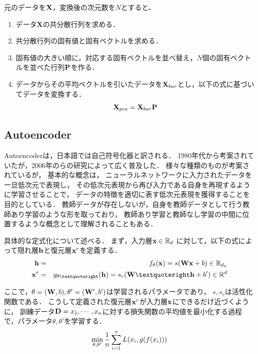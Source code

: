 元のデータを${\bf X}$，変換後の次元数を$N$とすると、
\begin{enumerate}
	\item データ{\bf X}の共分散行列を求める． 
	\item 共分散行列の固有値と固有ベクトルを求める． 
	\item 固有値の大きい順に，対応する固有ベクトルを並べ替え，$N$個の固有ベクトルを並べた行列${\bf P}$を作る． 
	\item データからその平均ベクトルを引いたデータを${\bf X}_{bar}$とし，以下の式に基づいてデータを変換する． 
	\begin{equation}
		{\bf X}_{pca} = {\bf X}_{bar} {\bf P}
	\end{equation}
\end{enumerate}





\subsection{Autoencoder}
Autoencoderは，日本語では自己符号化器と訳される．
1980年代から考案されていたが，2006年の\cite{hinton2006reducing}らの研究によって広く普及した．
様々な種類のものが考案されているが，
基本的な概念は，
ニューラルネットワークに入力されたデータを一旦低次元で表現し，
その低次元表現から再び入力である自身を再現するように学習させることで，
データの特徴を適切に表す低次元表現を獲得することを目的としている．
教師データが存在しないが，自身を教師データとして行う教師あり学習のような形を取っており，
教師あり学習と教師なし学習の中間に位置するような概念として理解されることもある．


具体的な定式化について述べる．
まず，入力層${\bf x} \in \mathbb{R}_d$
に対して，以下の式によって隠れ層${\bf h}$と復元層${\bf x}^r$を定義する．
\begin{eqnarray} 
\label{eq:autoencoder_hidden}
{\bf h} &=& f_\theta({\bf x}) = s({\bf W} {\bf x} + b)\in\mathbb R_{d_h}
\\
\label{eq:autoencoder_reconstruct}
{\bf x}^r &=& g_{\theta’}({\bf h}) = s_r({\bf W’} {\bf h} + b')\in\mathbb R^d
\end{eqnarray} 

ここで，$\theta=({\bf W}, b), \theta'=({\bf W'}, b')$は学習されるパラメータであり，
$s, s_r$は活性化関数である．
こうして定義された復元層${\bf x}^r$が入力層${\bf x}$にできるだけ近づくように，
訓練データ${\bf D} = x_1, \cdots, x_n$に対する損失関数の平均値を最小化する過程で，パラメータ$\theta, \theta'$を学習する．
\begin{eqnarray}
\label{eq:autoencoder_loss}
{\min_{\theta, \theta'} {1\over n}\sum_{i=1}^n L(x_i, g(f(x_i)))}
\end{eqnarray}

